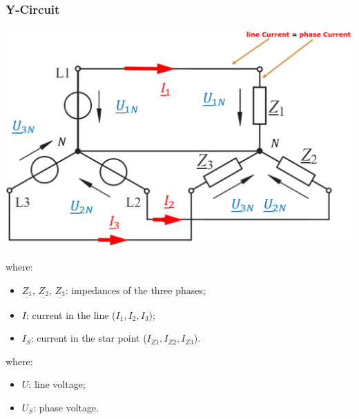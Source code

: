 \documentclass{article}
\begin{document}
\newpage
\subsubsection{Y-Circuit}
\begin{center}
    \includegraphics[width=.75\textwidth]{media/y_circuit.png}
\end{center}


where:
\begin{itemize}
    \item $\underline{Z_1}$, $\underline{Z_2}$, $\underline{Z_3}$: impedances of the three phases;
    \item $I$: current in the line ($I_1, I_2, I_3$);
    \item $I_S$: current in the star point ($I_{Z1}, I_{Z2}, I_{Z3}$).
\end{itemize}


where:
\begin{itemize}
    \item $U$: line voltage;
    \item $U_S$: phase voltage.
\end{itemize}

\end{document}
